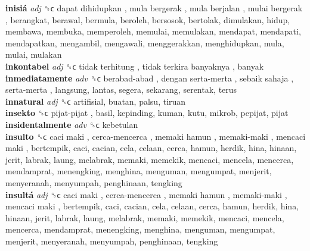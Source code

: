 \textbf{inisiá} \emph{adj}  ␝ϲ   dapat dihidupkan ,  mula bergerak ,  mula berjalan ,  mulai bergerak , berangkat, berawal, bermula, beroleh, bersosok, bertolak, dimulakan, hidup, membawa, membuka, memperoleh, memulai, memulakan, mendapat, mendapati, mendapatkan, mengambil, mengawali, menggerakkan, menghidupkan, mula, mulai, mulakan  \\
\textbf{inkontabel} \emph{adj}  ␝ϲ   tidak terhitung ,  tidak terkira banyaknya , banyak  \\
\textbf{inmediatamente} \emph{adv}  ␝ϲ   berabad-abad ,  dengan serta-merta ,  sebaik sahaja ,  serta-merta , langsung, lantas, segera, sekarang, serentak, terus  \\
\textbf{innatural} \emph{adj}  ␝ϲ  artifisial, buatan, palsu, tiruan  \\
\textbf{insekto} ␝ϲ   pijat-pijat , basil, kepinding, kuman, kutu, mikrob, pepijat, pijat  \\
\textbf{insidentalmente} \emph{adv}  ␝ϲ  kebetulan  \\
\textbf{insulto} ␝ϲ   caci maki ,  cerca-mencerca ,  memaki hamun ,  memaki-maki ,  mencaci maki , bertempik, caci, cacian, cela, celaan, cerca, hamun, herdik, hina, hinaan, jerit, labrak, laung, melabrak, memaki, memekik, mencaci, mencela, mencerca, mendamprat, menengking, menghina, menguman, mengumpat, menjerit, menyeranah, menyumpah, penghinaan, tengking  \\
\textbf{insultá} \emph{adj}  ␝ϲ   caci maki ,  cerca-mencerca ,  memaki hamun ,  memaki-maki ,  mencaci maki , bertempik, caci, cacian, cela, celaan, cerca, hamun, herdik, hina, hinaan, jerit, labrak, laung, melabrak, memaki, memekik, mencaci, mencela, mencerca, mendamprat, menengking, menghina, menguman, mengumpat, menjerit, menyeranah, menyumpah, penghinaan, tengking  \\
